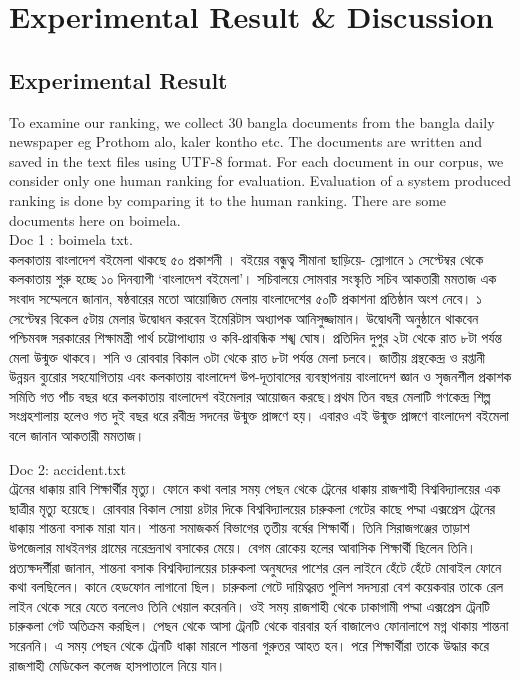 \chapter{Experimental Result \& Discussion}
\label{Ch_Chapter5}


\section{Experimental Result}

To examine our ranking, we collect 30 bangla documents from the bangla daily newspaper eg Prothom alo, kaler kontho etc. The documents are written and saved in the text files using UTF-8 format. For each document in our corpus, we consider only one human ranking for evaluation. Evaluation of a system produced ranking is done by comparing it to the human ranking. There are some documents here on boimela.\\

Doc 1 : boimela txt.\\
কলকাতায় বাংলাদেশ বইমেলা থাকছে ৫০ প্রকাশনী । বইয়ের বন্ধুত্ব সীমানা ছাড়িয়ে- স্লোগানে ১ সেপ্টেম্বর থেকে কলকাতায় শুরু হচ্ছে ১০ দিনব্যাপী ‘বাংলাদেশ বইমেলা’। সচিবালয়ে সোমবার সংস্কৃতি সচিব আকতারী মমতাজ এক সংবাদ সম্মেলনে জানান, ষষ্ঠবারের মতো আয়োজিত মেলায় বাংলাদেশের ৫০টি প্রকাশনা প্রতিষ্ঠান অংশ নেবে। ১ সেপ্টেম্বর বিকেল ৫টায় মেলার উদ্বোধন করবেন ইমেরিটাস অধ্যাপক আনিসুজ্জামান। উদ্বোধনী অনুষ্ঠানে থাকবেন পশ্চিমবঙ্গ সরকারের শিক্ষামন্ত্রী পার্থ চট্টোপাধ্যায় ও কবি-প্রাবন্ধিক শঙ্খ ঘোষ। প্রতিদিন দুপুর ২টা থেকে রাত ৮টা পর্যন্ত মেলা উন্মুক্ত থাকবে। শনি ও রোববার বিকাল ৩টা থেকে রাত ৮টা পর্যন্ত মেলা চলবে।
জাতীয় গ্রন্থকেন্দ্র ও রপ্তানী উন্নয়ন ব্যুরোর সহযোগিতায় এবং কলকাতায় বাংলাদেশ উপ-দূতাবাসের ব্যবস্থাপনায় বাংলাদেশ জ্ঞান ও সৃজনশীল প্রকাশক সমিতি গত পাঁচ বছর ধরে কলকাতায় বাংলাদেশ বইমেলার আয়োজন করছে।প্রথম তিন বছর মেলাটি গণকেন্দ্র শিল্প সংগ্রহশালায় হলেও গত দুই বছর ধরে রবীন্দ্র সদনের উন্মুক্ত প্রাঙ্গণে হয়। এবারও এই উন্মুক্ত প্রাঙ্গণে বাংলাদেশ বইমেলা বলে জানান আকতারী মমতাজ।

Doc 2: accident.txt\\
ট্রেনের ধাক্কায় রাবি শিক্ষার্থীর মৃত্যু। ফোনে কথা বলার সময় পেছন থেকে ট্রেনের ধাক্কায় রাজশাহী বিশ্ববিদ্যালয়ের এক ছাত্রীর মৃত্যু হয়েছে। রোববার বিকাল সোয়া ৪টার দিকে বিশ্ববিদ্যালয়ের চারুকলা গেটের কাছে পদ্মা এক্সপ্রেস ট্রেনের ধাক্কায় শান্তনা বসাক মারা যান।  শান্তনা সমাজকর্ম বিভাগের তৃতীয় বর্ষের শিক্ষার্থী। তিনি সিরাজগঞ্জের তাড়াশ উপজেলার মাধইনগর গ্রামের নরেন্দ্রনাথ বসাকের মেয়ে। বেগম রোকেয় হলের আবাসিক শিক্ষার্থী ছিলেন তিনি। প্রত্যক্ষদর্শীরা জানান, শান্তনা বসাক বিশ্ববিদ্যালয়ের চারুকলা অনুষদের পাশের রেল লাইনে হেঁটে হেঁটে মোবাইল ফোনে কথা বলছিলেন। কানে হেডফোন লাগানো ছিল। চারুকলা গেটে দায়িত্বরত পুলিশ সদস্যরা বেশ কয়েকবার তাকে রেল লাইন থেকে সরে যেতে বললেও তিনি খেয়াল করেননি।   ওই সময় রাজশাহী থেকে ঢাকাগামী পদ্মা এক্সপ্রেস ট্রেনটি চারুকলা গেট অতিক্রম করছিল। পেছন থেকে আসা ট্রেনটি থেকে বারবার হর্ন বাজালেও ফোনালাপে মগ্ন থাকায় শান্তনা সরেননি। এ সময় পেছন থেকে ট্রেনটি ধাক্কা মারলে শান্তনা গুরুতর আহত হন। পরে শিক্ষার্থীরা তাকে উদ্ধার করে রাজশাহী মেডিকেল কলেজ হাসপাতালে নিয়ে যান।


